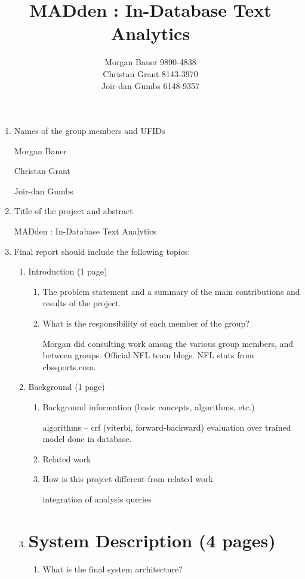 \documentclass{article}
\title{MADden : In-Database Text Analytics}
\author{Morgan Bauer 9890-4838 \\
  Christan Grant 8143-3970 \\
  Joir-dan Gumbs 6148-9357}
\begin{document}
\maketitle
\begin{enumerate}
\item Names of the group members and UFIDs


  Morgan Bauer

  Christan Grant

  Joir-dan Gumbs

\item Title of the project and abstract

  MADden : In-Database Text Analytics

\item Final report should include the following topics:
  \begin{enumerate}

  \item  Introduction (1 page)
    \begin{enumerate}
    \item The problem statement and a summary of the main contributions and results of the project.
    \item What is the responsibility of each member of the group?

      Morgan did consulting work among the various group members, and between groups.
      Official NFL team blogs. NFL stats from cbssports.com.
    \end{enumerate}

  \item Background (1 page)
    \begin{enumerate}
    \item Background information (basic concepts, algorithms, etc.)

      algorithms -- crf (viterbi, forward-backward) evaluation over trained model done in database.

    \item Related work
    \item How is this project different from related work

      integration of analysis queries
    \end{enumerate}

  \item
    \section{System Description (4 pages)}
    \begin{enumerate}
    \item What is the final system architecture?


\end{enumerate}
\end{enumerate}
\end{enumerate}
\end{document}
